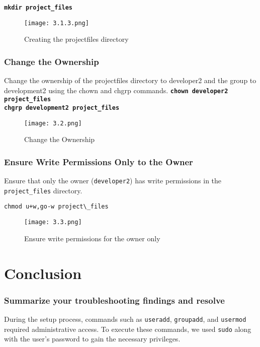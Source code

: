 \documentclass[12pt]{article}
\begin{document}
\textbf{\texttt{mkdir project\_files}}
\begin{figure}[H] %
    \centering
    \texttt{[image: 3.1.3.png]}
    \caption{Creating the projectfiles directory}
    \label{fig:labelname}
\end{figure}


\subsubsection{Change the Ownership}
Change the ownership of the projectfiles directory to developer2 and the group to development2 using the chown and chgrp commands.
\textbf{\texttt{chown developer2 project\_files}} \\
\textbf{\texttt{chgrp development2 project\_files}}

\begin{figure}[H] %
    \centering
    \texttt{[image: 3.2.png]}
    \caption{Change the Ownership}
    \label{fig:projectfiles-directory}
\end{figure}

\subsubsection{Ensure Write Permissions Only to the Owner}

Ensure that only the owner (\texttt{developer2}) has write permissions in the \texttt{project\_files} directory.
\begin{verbatim}
chmod u+w,go-w project\_files
\end{verbatim}

\begin{figure}[H] %
    \centering
    \texttt{[image: 3.3.png]}
    \caption{Ensure write permissions for the owner only}
    \label{fig:write-permissions-owner}
\end{figure}


\section{Conclusion}

\subsubsection{Summarize your troubleshooting findings and resolve}
During the setup process, commands such as \texttt{useradd}, \texttt{groupadd}, and \texttt{usermod} required administrative access. 
To execute these commands, we used \texttt{sudo} along with the user's password to gain the necessary privileges.
\end{document}
